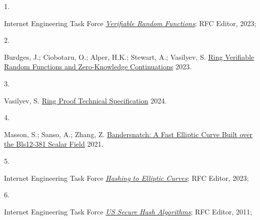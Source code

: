 \documentclass[
]{article}
\newlength{\cslhangindent}
\newlength{\csllabelwidth}
\newlength{\cslentryspacingunit} %
\newenvironment{CSLReferences}[2] %
 {%
  \setlength{\parindent}{0pt}
  \ifodd #1
  \let\oldpar\par
  \def\par{\hangindent=\cslhangindent\oldpar}
  \fi
  \setlength{\parskip}{#2\cslentryspacingunit}
 }%
 {}
\newcommand{\CSLLeftMargin}[1]{\parbox[t]{\csllabelwidth}{#1}}
\newcommand{\CSLRightInline}[1]{\parbox[t]{\linewidth - \csllabelwidth}{#1}\break}
\begin{document}
\hypertarget{refs}{}
\begin{CSLReferences}{0}{0}
\leavevmode{}%
\CSLLeftMargin{1. }
\CSLRightInline{Internet Engineering Task Force
\emph{\href{https://datatracker.ietf.org/doc/rfc9381}{{Verifiable Random
Functions}}}; {RFC Editor}, 2023;}

\leavevmode{}%
\CSLLeftMargin{2. }
\CSLRightInline{Burdges, J.; Ciobotaru, O.; Alper, H.K.; Stewart, A.;
Vasilyev, S. \href{https://eprint.iacr.org/2023/002}{Ring Verifiable
Random Functions and Zero-Knowledge Continuations} 2023.}

\leavevmode{}%
\CSLLeftMargin{3. }
\CSLRightInline{Vasilyev, S.
\href{https://hackmd.io/ulW5nFFpTwClHsD0kusJAA}{Ring Proof Technical
Specification} 2024.}

\leavevmode{}%
\CSLLeftMargin{4. }
\CSLRightInline{Masson, S.; Sanso, A.; Zhang, Z.
\href{https://eprint.iacr.org/2021/1152}{Bandersnatch: A Fast Elliptic
Curve Built over the Bls12-381 Scalar Field} 2021.}

\leavevmode{}%
\CSLLeftMargin{5. }
\CSLRightInline{Internet Engineering Task Force
\emph{\href{https://datatracker.ietf.org/doc/rfc9380}{{Hashing to
Elliptic Curves}}}; {RFC Editor}, 2023;}

\leavevmode{}%
\CSLLeftMargin{6. }
\CSLRightInline{Internet Engineering Task Force
\emph{\href{https://datatracker.ietf.org/doc/rfc6234}{{US Secure Hash
Algorithms}}}; {RFC Editor}, 2011;}

\end{CSLReferences}
\end{document}
